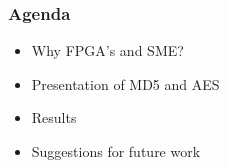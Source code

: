 \begin{frame}
  \frametitle{Agenda}
  \begin{itemize}
    \item Why FPGA's and SME?
    \item Presentation of MD5 and AES
    \item Results
    \item Suggestions for future work
  \end{itemize}
\end{frame}
